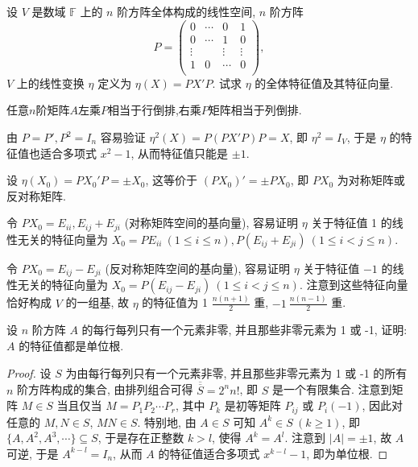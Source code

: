 \documentclass[../../main.tex]{subfiles}
\begin{document}
\begin{example}
设 \( V \) 是数域 \( \mathbb{F} \) 上的 \( n \) 阶方阵全体构成的线性空间, \( n \) 阶方阵
\[
P=\left( \begin{matrix}
0&		\cdots&		0&		1\\
0&		\cdots&		1&		0\\
\vdots&		&		\vdots&		\vdots\\
1&		0&		\cdots&		0\\
\end{matrix} \right) ,
\]
\( V \) 上的线性变换 \( \eta \) 定义为 \( \eta(X) = PX'P \). 试求 \( \eta \) 的全体特征值及其特征向量.
\end{example}
\begin{note}
任意$n$阶矩阵$A$左乘$P$相当于行倒排,右乘$P$矩阵相当于列倒排.
\end{note}
\begin{solution}
由 \( P = P', P^2 = I_n \) 容易验证 \( \eta^2(X) = P(PX'P)P = X \), 即 \( \eta^2 = I_V \), 于是 \( \eta \) 的特征值也适合多项式 \( x^2 - 1 \), 从而特征值只能是 \( \pm 1 \).

设 \( \eta(X_0) = PX_0'P = \pm X_0 \), 这等价于 \( (PX_0)' = \pm PX_0 \), 即 \( PX_0 \) 为对称矩阵或反对称矩阵. 

令 \( PX_0 = E_{ii}, E_{ij} + E_{ji} \) (对称矩阵空间的基向量), 容易证明 \( \eta \) 关于特征值 1 的线性无关的特征向量为 \( X_0 = PE_{ii} \ (1 \leqslant  i \leqslant  n), P(E_{ij} + E_{ji}) \ (1 \leqslant  i < j \leqslant  n) \).

令 \( PX_0 = E_{ij} - E_{ji} \) (反对称矩阵空间的基向量), 容易证明 \( \eta \) 关于特征值 \( -1 \) 的线性无关的特征向量为 \( X_0 = P(E_{ij} - E_{ji}) \ (1 \leqslant  i < j \leqslant  n) \). 注意到这些特征向量恰好构成 \( V \) 的一组基, 故 \( \eta \) 的特征值为 1 \( \frac{n(n+1)}{2} \) 重, \( -1 \ \frac{n(n-1)}{2} \) 重.
\end{solution}

\begin{example}
设 \( n \) 阶方阵 \( A \) 的每行每列只有一个元素非零, 并且那些非零元素为 1 或 -1, 证明: \( A \) 的特征值都是单位根.
\end{example}
\begin{proof}
设 \( S \) 为由每行每列只有一个元素非零, 并且那些非零元素为 1 或 -1 的所有 \( n \) 阶方阵构成的集合, 由排列组合可得 \( \overline{\overline{S}} = 2^n n! \), 即 \( S \) 是一个有限集合. 注意到矩阵 \( M \in S \) 当且仅当 \( M = P_1 P_2 \cdots P_r \), 其中 \( P_k \) 是初等矩阵 \( P_{ij} \) 或 \( P_i(-1) \), 因此对任意的 \( M, N \in S \), \( MN \in S \). 特别地, 由 \( A \in S \) 可知 \( A^k \in S \ (k \geqslant  1) \), 即 \( \{A, A^2, A^3, \cdots\} \subseteq S \), 于是存在正整数 \( k > l \), 使得 \( A^k = A^l \). 注意到 \( |A| = \pm 1 \), 故 \( A \) 可逆, 于是 \( A^{k-l} = I_n \), 从而 \( A \) 的特征值适合多项式 \( x^{k-l} - 1 \), 即为单位根.
\end{proof}
\end{document}
